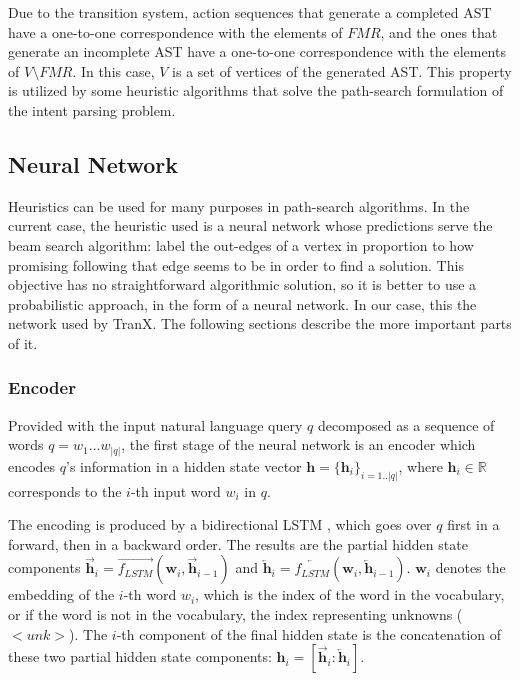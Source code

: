 Due to the transition system, action sequences that generate a completed
AST have a one-to-one correspondence with the elements of \(FMR\),
and the ones that generate an incomplete AST have a one-to-one correspondence
with the elements of \(V \setminus FMR\). In this case, \( V \) is a set
of vertices of the generated AST. This property is utilized by some
heuristic algorithms that solve the path-search formulation of
the intent parsing problem.

\subsection{Neural Network}

Heuristics can be used for many purposes in path-search algorithms. In the current
case, the heuristic used is a neural network whose predictions serve the
beam search algorithm: label the out-edges of a vertex in proportion to how promising
following that edge seems to be in order to find a solution. This objective has no straightforward algorithmic solution, so it is better to use a probabilistic
approach, in the form of a neural network. In our case, this the network used by
TranX. The following sections describe the more important parts of it.

\subsubsection{Encoder}

Provided with the input natural language query \(q\) decomposed as a sequence
of words \(q = w_{1}...w_{|q|}\), the first stage of the neural network is an
encoder which encodes \(q\)'s information in a hidden state vector \(\mathbf{h} =
\{\mathbf{h}_{i}\}_{i=1..|q|}\), where \(\mathbf{h}_{i} \in \mathbb{R}\)
corresponds to the \(i\)-th input word \(w_{i}\) in \(q\).

The encoding is produced by a bidirectional LSTM \cite{HochreiterSchmidhuber1997,
SchusterPaliwal1997}, which goes over \(q\) first in a forward, then in a backward
order. The results are the partial hidden state components
\(\overrightarrow{\mathbf{h}}_{i} = \overrightarrow{f_{LSTM}}(\mathbf{w}_{i}, \overrightarrow{\mathbf{h}}_{i-1})\) and \(\overleftarrow{\mathbf{h}}_{i} =
\overleftarrow{f_{LSTM}}(\mathbf{w}_{i}, \overleftarrow{\mathbf{h}}_{i-1})\).
\(\mathbf{w}_{i}\) denotes the embedding of the \(i\)-th word \(w_{i}\), 
which is the index of the word in the vocabulary, or if the word is not
in the vocabulary, the index representing unknowns (\(<unk>\)).
The \(i\)-th component of the final hidden state is the concatenation of
these two partial hidden state components: \(\mathbf{h}_{i} = 
[\overrightarrow{\mathbf{h}}_{i} : \overleftarrow{\mathbf{h}}_{i}]\).

